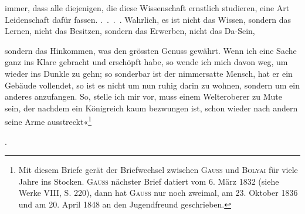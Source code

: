 immer, dass alle diejenigen, die diese Wissenschaft ernstlich studieren, eine
Art Leidenschaft dafür fassen. .\ .\ .\ . Wahrlich, es ist nicht das Wissen, sondern
das Lernen, nicht das Besitzen, sondern das Erwerben, nicht das Da-Sein,\par
{}
\clearpage{}
\noindent sondern das Hinkommen, was den grössten Genuss gewährt. Wenn ich eine
Sache ganz ins Klare gebracht und erschöpft habe, so wende ich mich davon
weg, um wieder ins Dunkle zu gehn; so sonderbar ist der nimmersatte Mensch,
hat er ein Gebäude vollendet, so ist es nicht um nun ruhig darin zu wohnen,
sondern um ein anderes anzufangen. So, stelle ich mir vor, muss einem Welteroberer
zu Mute sein, der nachdem ein Königreich kaum bezwungen ist,
schon wieder nach andern seine Arme ausstreckt«\begingroup\renewcommand{\thefootnote}{168a)}\footnote{Mit diesem Briefe gerät der Briefwechsel zwischen \textsc{Gauss} und \textsc{Bolyai} für viele Jahre ins Stocken. \textsc{Gauss} nächster Brief datiert vom 6. März 1832 (siehe Werke VIII, S. 220), dann hat \textsc{Gauss} nur noch zweimal, am 23. Oktober 1836 und am 20. April 1848 an den Jugendfreund geschrieben.}\addtocounter{footnote}{-1}\endgroup.
